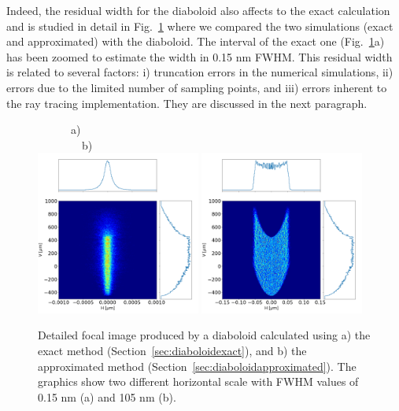 \documentclass{iucr}              %
\newcommand{\inred}[1]{{\color{red}#1}}
\begin{document}
Indeed, the residual width for the diaboloid also affects to the exact calculation and is studied in detail in Fig.~\ref{fig:mathematica} where we compared the two simulations (exact and approximated) with the diaboloid. The interval of the exact one (Fig.~\ref{fig:mathematica}a) has been zoomed to estimate the width in 0.15 nm FWHM. This residual width is related to several factors: i) truncation errors in the numerical simulations, ii) errors due to the limited number of sampling points, \inred{and iii) errors inherent to the ray tracing implementation. They are discussed in the next paragraph.}



\begin{figure}\label{fig:mathematica}
\flushleft
~~~~~~a)~~~~~~~~~~~~~~~~~~~~~~~~~~~~~~~~~~~~~~~~~~~~~~~~~~~~~~~~~~~~b)\\
\centering
\includegraphics[width=0.48\textwidth]{figures/p2s_exact1.png}
\includegraphics[width=0.48\textwidth]{figures/p2s_approx1.png}
\caption{\inred{Detailed focal image produced by a diaboloid calculated using a) the exact method (Section~\ref{sec:diaboloidexact}), and b) the approximated method (Section~\ref{sec:diaboloidapproximated}). The graphics show two different horizontal scale with FWHM values of 0.15 nm (a) and 105 nm (b).}}
\end{figure}
\end{document}
